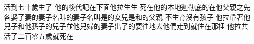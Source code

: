 活到七十歲\chientien 生了\chientien{}\chientien{}\chuan\Chuan
{}他的後代\chientien 記在下面\yuentien 他拉生\chientien{}\chientien{}\yuentien{}生\chuan 
{}死在他的本地迦勒底的\chientien 在他父\hss\linebreak 親之先\chuan 
{}\chientien{}\chientien 各娶了妻\yuentien{}的妻子名叫\yuentien{}的妻子名叫\chientien 是的女兒\yuentien {}\hss\linebreak{}是和的父親\chuan 
{}不生育\chientien 沒有孩子\chuan 
{}他拉帶著他兒子\chientien 和他孫子的兒子\chientien\hss\linebreak 並他兒婦的妻子\chientien 出了的\chientien 要往地去\chientien 他們走到就住在那裡\chuan 
{}他拉共活了二百零五歲\chientien 就死在\chuan 
